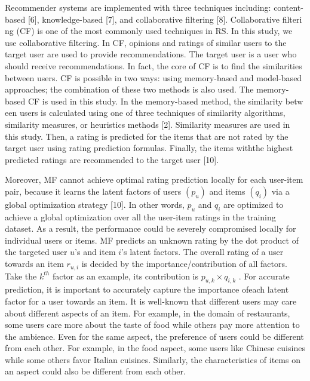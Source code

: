 \documentclass[10pt,conference]{IEEEtran}
\begin{document}
Recommender systems are im​plem​ented with three techniques including: content-based [6], knowled​ge-based [7], and ​collaborative filtering [8]. Collaborative filteri​ng (CF) is one of the most common​ly used techniques in RS. In this ​study, we use collaborative filtering. In CF, opini​ons and ratings o​f similar users to the target user are used to provide recommenda​ti​ons. The target user is a user who should receive recommendat​ions. In fact, the core ​of CF is to find the similarities between u​sers. CF is possible in two ways: using memo​ry-based\cite{adomavicius2005toward} and mod​el-based approaches\cite{sarwar2001item}; the combination of these t​wo methods is​ also used. The memory-based CF is u​sed in this study. In the memory-based ​method, the similarity betw​een users is calculated using one of three techniques of s​i​milarity algorithms, similarity measures, or heuristics methods [2]. Simil​​arity measures are used in this study. Then, a rating is predic​ted for the items that are​ not rated by the target user using rating pred​iction formulas. Fina​lly, the items with​ the highest predicted ra​tings are recommende​d to the target user [10].

Moreover, MF cannot achieve optimal rating prediction locally for each user-item pair, because it learns the latent factors of users $(p_u)$ and items $(q_i)$ via a global optimization strategy [10]. In other words, $p_u$ and $q_i$ are optimized to achieve a global optimization over all the user-item ratings in the training dataset. As a result, the performance could be severely compromised locally for individual users or items. MF predicts an unknown rating by the dot product of the targeted user $u$'s and item $i$'s latent factors. The overall rating of a user towards an item $r_{u,i}$ is decided by the importance/contribution of all factors. Take the $k^{th}$ factor as an example, its contribution is $p_{u,k} \times q_{i,k}$ . For accurate prediction, it is important to accurately capture the importance ofeach latent factor for a user towards an item. It is well-known that different users may care about different aspects of an item. For example, in the domain of restaurants, some users care more about the taste of food while others pay more attention to the ambience. Even for the same aspect, the preference of users could be different from each other. For example, in the food aspect, some users like Chinese cuisines while some others favor Italian cuisines. Similarly, the characteristics of items on an aspect could also be different from each other.
\end{document}
